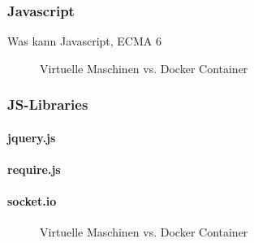 \documentclass[a4paper]{spie}  %
\begin{document}
\subsubsection{Javascript}
Was kann Javascript, ECMA 6
\begin{figure}[h!]
	\centering
		\caption{Virtuelle Maschinen vs. Docker Container\cite{dockercontainer}}
		\label{fig:dockerVM}
\end{figure}
\subsubsection{JS-Libraries}
\paragraph{jquery.js}
\paragraph{require.js}
\paragraph{socket.io}
\begin{figure}[h!]
	\centering
		\caption{Virtuelle Maschinen vs. Docker Container\cite{dockercontainer}}
		\label{fig:dockerVM}
\end{figure}
\end{document}
